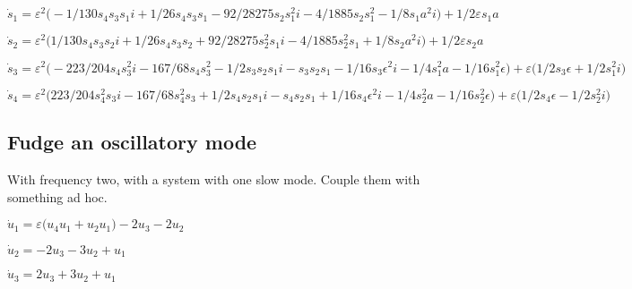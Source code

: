 \documentclass[11pt,a5paper]{article}
\begin{document}
\begin{math}
\dot s_{1}=\varepsilon ^{2} \big(-1/130 s_{4} s_{3} s_{1} i+1/26 s_{4} s
_{3} s_{1}-92/28275 s_{2} s_{1}^{2} i-4/1885 s_{2} s_{1}^{2}-1/8 s_{1} a
^{2} i\big)+1/2 \varepsilon  s_{1} a
\end{math}\par

\begin{math}
\dot s_{2}=\varepsilon ^{2} \big(1/130 s_{4} s_{3} s_{2} i+1/26 s_{4} s_
{3} s_{2}+92/28275 s_{2}^{2} s_{1} i-4/1885 s_{2}^{2} s_{1}+1/8 s_{2} a
^{2} i\big)+1/2 \varepsilon  s_{2} a
\end{math}\par

\begin{math}
\dot s_{3}=\varepsilon ^{2} \big(-223/204 s_{4} s_{3}^{2} i-167/68 s_{4}
 s_{3}^{2}-1/2 s_{3} s_{2} s_{1} i-s_{3} s_{2} s_{1}-1/16 s_{3} 
\epsilon ^{2} i-1/4 s_{1}^{2} a-1/16 s_{1}^{2} \epsilon \big)+
\varepsilon  \big(1/2 s_{3} \epsilon +1/2 s_{1}^{2} i\big)
\end{math}\par

\begin{math}
\dot s_{4}=\varepsilon ^{2} \big(223/204 s_{4}^{2} s_{3} i-167/68 s_{4}
^{2} s_{3}+1/2 s_{4} s_{2} s_{1} i-s_{4} s_{2} s_{1}+1/16 s_{4} 
\epsilon ^{2} i-1/4 s_{2}^{2} a-1/16 s_{2}^{2} \epsilon \big)+
\varepsilon  \big(1/2 s_{4} \epsilon -1/2 s_{2}^{2} i\big)
\end{math}






\subsection{Fudge an oscillatory mode}
With frequency two, with a system with one slow mode.
Couple them with something ad hoc.

\begin{math}
\dot u_{1}=\varepsilon  \big(u_{4} u_{1}+u_{2} u_{1}\big)-2 u_{3}-2 u_{2
}
\end{math}\par

\begin{math}
\dot u_{2}=-2 u_{3}-3 u_{2}+u_{1}
\end{math}\par

\begin{math}
\dot u_{3}=2 u_{3}+3 u_{2}+u_{1}
\end{math}\par
\end{document}
